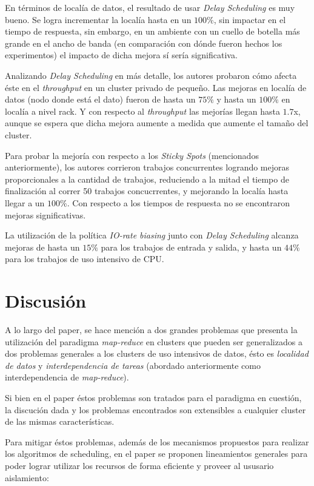 \documentclass[a4paper]{article}
\begin{document}
En términos de localía de datos, el resultado de usar \textit{Delay Scheduling}
es muy bueno. Se logra incrementar la localía hasta en un $100\%$, sin impactar
en el tiempo de respuesta, sin embargo, en un ambiente con un cuello de botella
más grande en el ancho de banda (en comparación con dónde fueron hechos los
experimentos) el impacto de dicha mejora sí sería significativa.

Analizando \textit{Delay Scheduling} en más detalle, los autores probaron cómo
afecta éste en el \textit{throughput} en un cluster privado de pequeño. Las
mejoras en localía de datos (nodo donde está el dato) fueron de hasta un $75\%$
y hasta un $100\%$ en localía a nivel rack. Y con respecto al
\textit{throughput} las mejorías llegan hasta $1.7$x, aunque se espera que
dicha mejora aumente a medida que aumente el tamaño del cluster.

Para probar la mejoría con respecto a los \textit{Sticky Spots} (mencionados
anteriormente), los autores corrieron trabajos concurrentes logrando mejoras
proporcionales a la cantidad de trabajos, reduciendo a la mitad el tiempo de
finalización al correr 50 trabajos concucrrentes, y mejorando la localía hasta
llegar a un $100\%$. Con respecto a los tiempos de respuesta no se encontraron
mejoras significativas.

La utilización de la política \textit{IO-rate biasing} junto con \textit{Delay
Scheduling} alcanza mejoras de hasta un $15\%$ para los trabajos de entrada
y salida, y hasta un $44\%$ para los trabajos de uso intensivo de CPU.

\newpage
\section{Discusión}
A lo largo del paper, se hace mención a dos grandes problemas que presenta la
utilización del paradigma \textit{map-reduce} en clusters que pueden ser
generalizados a dos problemas generales a los clusters de uso intensivos de
datos, ésto es \textit{localidad de datos} y \textit{interdependencia de
tareas} (abordado anteriormente como interdependencia de \textit{map-reduce}).

Si bien en el paper éstos problemas son tratados para el paradigma en cuestión,
la discución dada y los problemas encontrados son extensibles a cualquier
cluster de las mismas características.

Para mitigar éstos problemas, además de los mecanismos propuestos para realizar
los algoritmos de scheduling, en el paper se proponen lineamientos generales
para poder lograr utilizar los recursos de forma eficiente y proveer al
ususario aislamiento:
\end{document}
